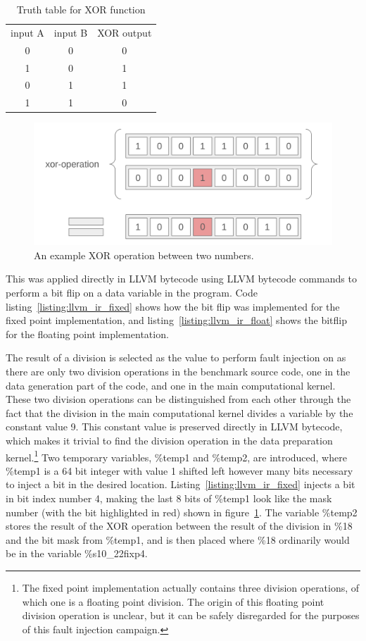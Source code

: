 \begin{table}[htb]
    \centering
\caption{Truth table for XOR function}
    \label{table:xor_truth_table}
\begin{tabular}{c|c|c}\label{table:xor_truth_table}
     input A& input B& XOR output \\
     0&0&0\\
     1&0&1\\
     0&1&1\\
     1&1&0
\end{tabular}
    
\end{table}



\begin{figure}[h!]
    \centering
    \includegraphics[width=0.5\linewidth]{Images/xor_operation.png}
    \caption{An example XOR operation between two numbers.}
    \label{fig:xor_operation}
\end{figure}

This was applied directly in LLVM bytecode using LLVM bytecode commands to perform a bit flip on a data variable in the program. Code listing~\ref{listing:llvm_ir_fixed} shows how the bit flip was implemented for the fixed point implementation, and listing~\ref{listing:llvm_ir_float} shows the bitflip for the floating point implementation.



The result of a division is selected as the value to perform fault injection on as there are only two division operations in the benchmark source code, one in the data generation part of the code, and one in the main computational kernel. These two division operations can be distinguished from each other through the fact that the division in the main computational kernel divides a variable by the constant value 9. This constant value is preserved directly in LLVM bytecode, which makes it trivial to find the division operation in the data preparation kernel.\footnote{The fixed point implementation actually contains three division operations, of which one is a floating point division. The origin of this floating point division operation is unclear, but it can be safely disregarded for the purposes of this fault injection campaign.}
Two temporary variables, \%temp1 and \%temp2, are introduced, where \%temp1 is a 64 bit integer with value 1 shifted left however many bits necessary to inject a bit in the desired location. Listing~\ref{listing:llvm_ir_fixed} injects a bit in bit index number 4, making the last 8 bits of \%temp1 look like the mask number (with the bit highlighted in red) shown in figure~\ref{fig:xor_operation}.
The variable \%temp2 stores the result of the XOR operation between the result of the division in \%18 and the bit mask from \%temp1, and is then placed where \%18 ordinarily would be in the variable \%s10\_22fixp4.

